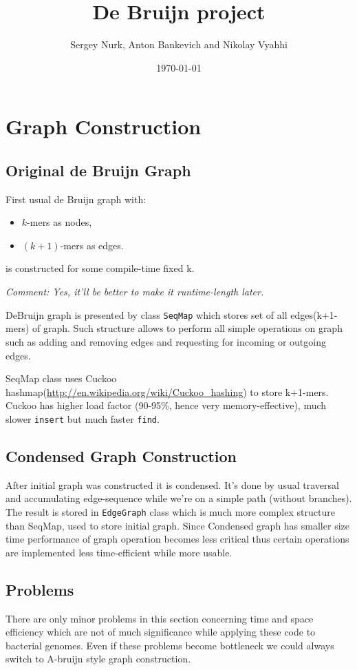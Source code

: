 \documentclass[14pt]{article}
\title{De Bruijn project}
\author{Sergey Nurk, Anton Bankevich and Nikolay Vyahhi}
\date{\today}
\begin{document}
\maketitle

\section{Graph Construction}

\subsection{Original de Bruijn Graph}

First usual de Bruijn graph with:
\begin{itemize}
\item $k$-mers as nodes,
\item $(k+1)$-mers as edges.
\end{itemize}
is constructed for some compile-time fixed k. 

\textit{Comment: Yes, it'll be better to make it runtime-length later.}

DeBruijn graph is presented by class \texttt{SeqMap} which stores set of all edges(k+1-mers) of graph. Such structure allows to perform all simple operations on graph such as adding and removing edges and requesting for incoming or outgoing edges.

SeqMap class uses Cuckoo hashmap(\url{http://en.wikipedia.org/wiki/Cuckoo_hashing}) to store k+1-mers. Cuckoo has higher load factor (90-95\%, hence very memory-effective), much slower \texttt{insert} but much faster \texttt{find}.

\subsection{Condensed Graph Construction}

After initial graph was constructed it is condensed. It's done by usual traversal and accumulating edge-sequence while we're on a simple path (without branches). The result is stored in \texttt{EdgeGraph} class which is much more complex structure than SeqMap, used to store initial graph. Since Condensed graph has smaller size time performance of graph operation becomes less critical thus certain operations are implemented less time-efficient while more usable.

\subsection{Problems}
There are only minor problems in this section concerning time and space efficiency which are not of much significance while applying these code to bacterial genomes. Even if these problems become bottleneck we could always switch to A-bruijn style graph construction.
\end{document}

